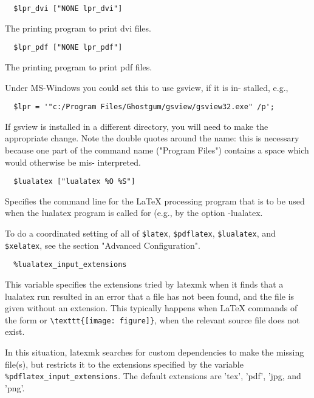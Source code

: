 \begin{verbatim}
  $lpr_dvi ["NONE lpr_dvi"]
\end{verbatim}

The printing program to print dvi files.

\begin{verbatim}
  $lpr_pdf ["NONE lpr_pdf"]
\end{verbatim}
       
The printing program to print pdf files.

Under  MS-Windows you could set this to use gsview, if it is in-
stalled, e.g.,

\begin{verbatim}
  $lpr = '"c:/Program Files/Ghostgum/gsview/gsview32.exe" /p';
\end{verbatim}

If gsview is installed in a different directory, you  will  need
to  make  the appropriate change.  Note the double quotes around
the name: this is necessary because one part of the command name
("Program Files") contains a space which would otherwise be mis-
interpreted.

\begin{verbatim}
  $lualatex ["lualatex %O %S"]
\end{verbatim}

Specifies the command line for the LaTeX processing program that
is  to be used when the lualatex program is called for (e.g., by
the option -lualatex.

To do a coordinated setting of all of \verb|$latex|, 
\verb|$pdflatex|, \verb|$lualatex|, and \verb|$xelatex|, see the section "Advanced Configuration".

\begin{verbatim}
  %lualatex_input_extensions
\end{verbatim}

This  variable specifies the extensions tried by latexmk when it finds that a
lualatex run resulted in an error that a  file  has not  been  found,  and  the
file is given without an extension.  This typically happens when LaTeX
commands  of  the  form  \verb||  or
\verb|\texttt{[image: figure]}|, when the relevant source file does not exist.

In this situation, latexmk searches for custom  dependencies  to make  the
missing  file(s),  but restricts it to the extensions specified by the variable
\verb|%pdflatex_input_extensions|.   The  default extensions are 'tex', 'pdf',
'jpg, and 'png'.

